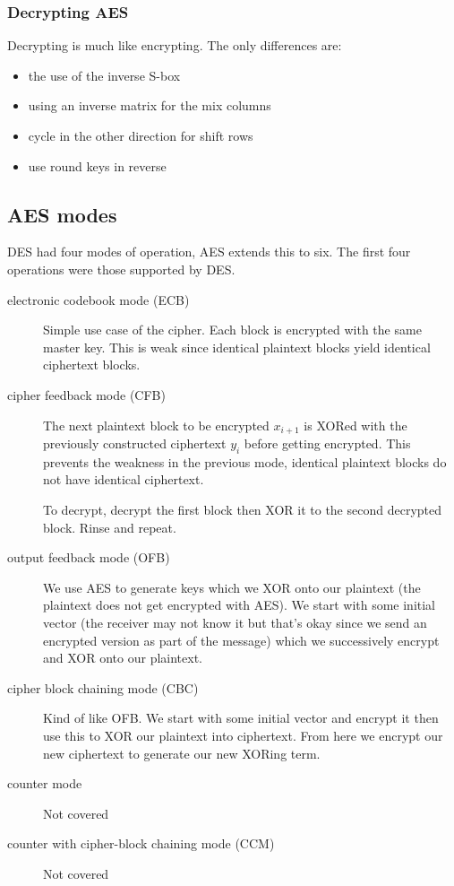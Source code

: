 \documentclass{report}
\begin{document}
\subsubsection{Decrypting AES}
Decrypting is much like encrypting. The only differences are:
\begin{itemize}
    \item the use of the inverse S-box
    \item using an inverse matrix for the mix columns
    \item cycle in the other direction for shift rows
    \item use round keys in reverse
\end{itemize}

\subsection{AES modes}
DES had four modes of operation, AES extends this to six. The first
four operations were those supported by DES\@.
\begin{description}
    \item [electronic codebook mode (ECB)]
        Simple use case of the cipher.
        Each block is encrypted with the same master key. This is weak since
        identical plaintext blocks yield identical ciphertext blocks.
    \item [cipher feedback mode (CFB)]
        The next plaintext block to be encrypted $x_{i+1}$ is XORed with the
        previously constructed ciphertext $y_{i}$ before getting encrypted.
        This prevents the weakness in the previous mode, identical plaintext
        blocks do not have identical ciphertext.

        To decrypt, decrypt the first block then XOR it to the second
        decrypted block. Rinse and repeat.
    \item [output feedback mode (OFB)]
        We use AES to generate keys which we XOR onto our plaintext
        (the plaintext does not get encrypted with AES).
        We start with some initial vector (the receiver may not know it but
        that's okay since we send an encrypted version as part of the message)
        which we successively encrypt and XOR onto our plaintext.
    \item [cipher block chaining mode (CBC)]
        Kind of like OFB\@. We start with some initial vector and encrypt it
        then use this to XOR our plaintext into ciphertext. From here we
        encrypt our new ciphertext to generate our new XORing term.
    \item [counter mode] Not covered
    \item [counter with cipher-block chaining mode (CCM)] Not covered
\end{description}
\end{document}
